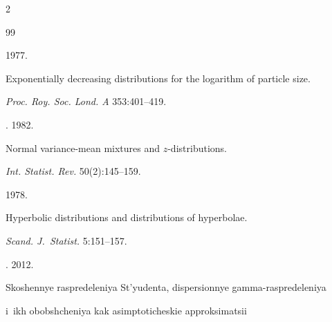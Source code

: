   \begin{multicols}{2}





\renewcommand{\bibname}{\protect\rmfamily References}







{\small\frenchspacing


 {%




 \begin{thebibliography}{99}







 1977.


Exponentially decreasing distributions for the logarithm of particle size.


\textit{Proc. Roy. Soc. Lond. A} 353:401--419.







. 1982.


Normal variance-mean mixtures and \mbox{$z$-distributions}.


\textit{Int. Statist. Rev.} 50(2):145--159.







 1978.


Hyperbolic distributions and distributions of hyperbolae.


\textit{Scand. J.~Statist.} 5:151--157.













. 2012.


Skoshennye raspredeleniya St'yudenta, dispersionnye gamma-raspredeleniya 


i~ikh obobshcheniya kak asimptoticheskie approksimatsii



\end{thebibliography}}}
\end{multicols}
